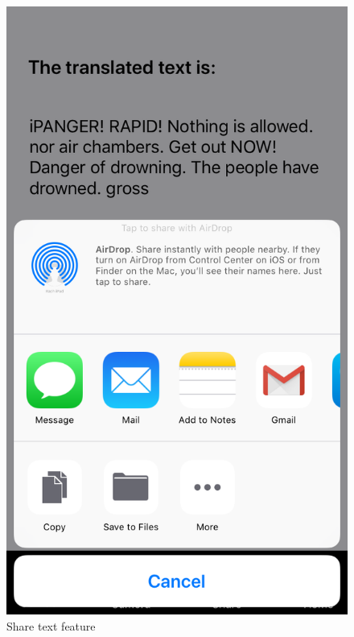 \documentclass[12pt]{article}
\begin{document}
\begin{figure} [H]
\begin{minipage}{.5\textwidth}
  \includegraphics[width=0.9\linewidth]{media/4.PNG}
  \caption{Share text feature}
  \label{fig:share}
\end{minipage}
\end{figure}
\end{document}

